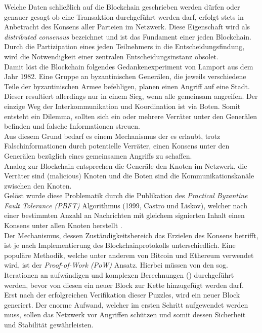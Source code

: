 Welche Daten schließlich auf die Blockchain geschrieben werden dürfen oder genauer gesagt ob eine Transaktion durchgeführt werden darf, erfolgt stets in Anbetracht des Konsens aller Parteien im Netzwerk. Diese Eigenschaft wird als \textit{distributed consensus} bezeichnet und ist das Fundament einer jeden Blockchain. Durch die Partizipation eines jeden Teilnehmers in die Entscheidungsfindung, wird die Notwendigkeit einer zentralen Entscheidungsinstanz obsolet. \\
Damit löst die Blockchain folgendes Gedankenexperiment von Lamport aus dem Jahr 1982. Eine Gruppe an byzantinischen Generälen, die jeweils verschiedene Teile der byzantinischen Armee befehligen, planen einen Angriff auf eine Stadt. Dieser resultiert allerdings nur in einem Sieg, wenn alle gemeinsam angreifen. Der einzige Weg der Interkommunikation und Koordination ist via Boten. Somit entsteht ein Dilemma, sollten sich ein oder mehrere Verräter unter den Generälen befinden und falsche Informationen streuen.\\
Aus diesem Grund bedarf es einem Mechanismus der es erlaubt, trotz Falschinformationen durch potentielle Verräter, einen Konsens unter den Generälen bezüglich eines gemeinsamen Angriffs zu schaffen. \\
Analog zur Blockchain entsprechen die Generäle den Knoten im Netzwerk, die Verräter sind  (malicious) Knoten und die Boten sind die Kommunikationskanäle zwischen den Knoten.\\
Gelöst wurde diese Problematik durch die Publikation des \textit{Practical Byzantine Fault Tolerance (PBFT)} Algorithmus (1999, Castro und Liskov), welcher nach einer bestimmten Anzahl an Nachrichten mit gleichem signierten Inhalt einen Konsens unter allen Knoten herstellt \cite{MasteringBlockchain}.\\ 
Der Mechanismus, dessen Zuständigkeitsbereich das Erzielen des Konsens betrifft, ist je nach Implementierung des Blockchainprotokolls unterschiedlich. Eine populäre Methodik, welche unter anderem von Bitcoin und Ethereum verwendet wird, ist der \textit{Proof-of-Work (PoW)} Ansatz. Hierbei müssen von den sog.  Iterationen an aufwändigen und komplexen Berechnungen () durchgeführt werden, bevor von diesen ein neuer Block zur Kette hinzugefügt werden darf. Erst nach der erfolgreichen Verifikation dieser Puzzles, wird ein neuer Block generiert. Der enorme Aufwand, welcher im ersten Schritt aufgewendet werden muss, sollen das Netzwerk vor Angriffen schützen und somit dessen Sicherheit und Stabilität gewährleisten. \\
